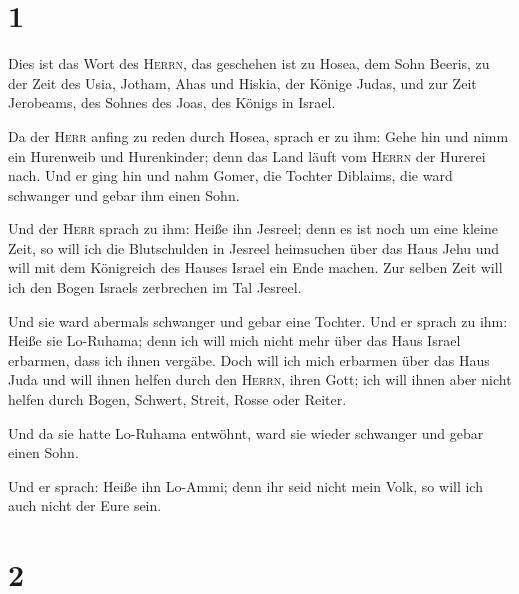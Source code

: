 \hypertarget{section}{%
\section{1}\label{section}}

 Dies ist das Wort des \textsc{Herrn}, das geschehen ist
zu Hosea, dem Sohn Beeris, zu der Zeit des Usia, Jotham, Ahas und
Hiskia, der Könige Judas, und zur Zeit Jerobeams, des Sohnes des Joas,
des Königs in Israel.

 Da der \textsc{Herr} anfing zu reden durch Hosea, sprach
er zu ihm: Gehe hin und nimm ein Hurenweib und Hurenkinder; denn das
Land läuft vom \textsc{Herrn} der Hurerei nach.  Und er
ging hin und nahm Gomer, die Tochter Diblaims, die ward schwanger und
gebar ihm einen Sohn.

 Und der \textsc{Herr} sprach zu ihm: Heiße ihn Jesreel;
denn es ist noch um eine kleine Zeit, so will ich die Blutschulden in
Jesreel heimsuchen über das Haus Jehu und will mit dem Königreich des
Hauses Israel ein Ende machen.  Zur selben Zeit will ich
den Bogen Israels zerbrechen im Tal Jesreel.

 Und sie ward abermals schwanger und gebar eine Tochter.
Und er sprach zu ihm: Heiße sie Lo-Ruhama; denn ich will mich nicht mehr
über das Haus Israel erbarmen, dass ich ihnen vergäbe. 
Doch will ich mich erbarmen über das Haus Juda und will ihnen helfen
durch den \textsc{Herrn}, ihren Gott; ich will ihnen aber nicht helfen
durch Bogen, Schwert, Streit, Rosse oder Reiter.

 Und da sie hatte Lo-Ruhama entwöhnt, ward sie wieder
schwanger und gebar einen Sohn.

 Und er sprach: Heiße ihn Lo-Ammi; denn ihr seid nicht
mein Volk, so will ich auch nicht der Eure sein.

\hypertarget{section-1}{%
\section{2}\label{section-1}}


